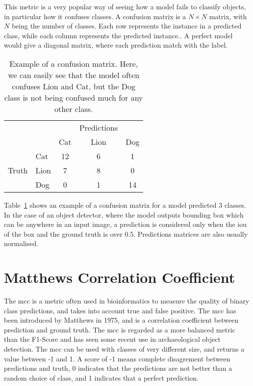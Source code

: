 This metric is a very popular way of seeing how a model fails to classify objects, in particular how it confuses classes. A confusion matrix is a $N \times N$ matrix, with $N$ being the number of classes. Each row represents the instance in a predicted class, while each column represents the predicted instance.\cite{powerDavid2008}. A perfect model would give a diagonal matrix, where each prediction match with the label. 

\begin{table}[H]
	\centering
	\begin{tabular}{ll|ccc}
		                           &      & \multicolumn{1}{l}{} & \multicolumn{1}{l}{Predictions} & \multicolumn{1}{l}{} \\ \cline{3-5} 
					                              &      & Cat                  & Lion                            & Dog                  \\ \hline
								      \multicolumn{1}{l|}{}      & Cat  & 12                   & 6                               & 1                    \\
								      \multicolumn{1}{l|}{Truth} & Lion & 7                    & 8                               & 0                    \\
								      \multicolumn{1}{l|}{}      & Dog  & 0                    & 1                               & 14                  
	\end{tabular}
	\caption{Example of a confusion matrix. Here, we can easily see that the model often confuses Lion and Cat, but the Dog class is not being confused much for any other class.}
	\label{tab:confusionMat}
\end{table}

Table~\ref{tab:confusionMat} shows an example of a confusion matrix for a model predicted 3 classes. In the case of an object detector, where the model outputs bounding box which can be anywhere in an input image, a prediction is considered only when the \gls{iou} of the box and the ground truth is over 0.5. Predictions matrices are also usually normalised.
\section{Matthews Correlation Coefficient}%
The \gls{mcc} is a metric often used in bioinformatics to measure the quality of binary class predictions, and takes into account true and false positive. The \gls{mcc} has been introduced by Matthews in 1975, and is a correlation coefficient between prediction and ground truth.\cite{matthews1975} The \gls{mcc} is regarded as a more balanced metric than the F1-Score\cite{chicco2020}\cite{luque2020} and has seen some recent use in archaeological object detection. The \gls{mcc} can be used with classes of very different size, and returns a value between -1 and 1. A score of -1 means complete disagrement between predictions and truth, 0 indicates that the predictions are not better than a random choice of class, and 1 indicates that a perfect prediction.

